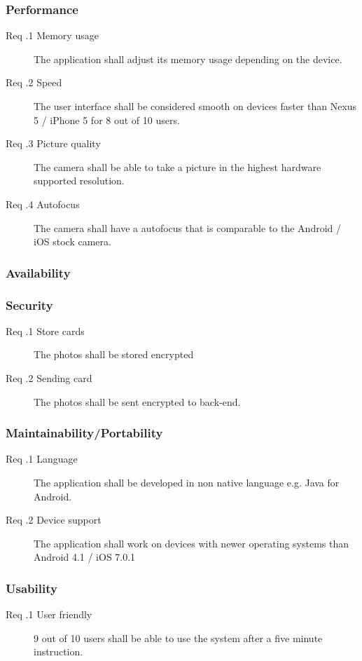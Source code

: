 \subsubsection{Performance}
\begin{description}
	\item[Req \tsss.1 Memory usage] The application shall adjust its memory usage depending on the device.
	\item[Req \tsss.2 Speed] The user interface shall be considered smooth on devices faster than Nexus 5 / iPhone 5 for 8 out of 10 users. 
	\item[Req \tsss.3 Picture quality] The camera shall be able to take a picture in the highest hardware supported resolution. 
	\item[Req \tsss.4 Autofocus] The camera shall have a autofocus that is comparable to the Android / iOS stock camera. 
\end{description}
\subsubsection{Availability}
\subsubsection{Security}
\begin{description}
	\item[Req \tsss.1 Store cards] The photos shall be stored encrypted
	\item[Req \tsss.2 Sending card] The photos shall be sent encrypted to back-end.
\end{description}
\subsubsection{Maintainability/Portability}
\begin{description}
	\item[Req \tsss.1 Language] The application shall be developed in non native language e.g. Java for Android. 
	\item[Req \tsss.2 Device support] The application shall work on devices with newer operating systems than Android 4.1 / iOS 7.0.1
\end{description}
\subsubsection{Usability}
\begin{description}
	\item [Req \tsss.1 User friendly] 9 out of 10 users shall be able to use the system after a five minute instruction.
\end{description}

